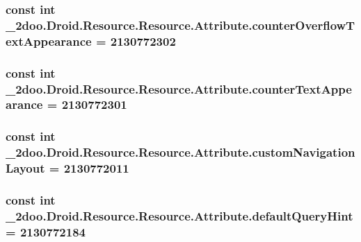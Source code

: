 \hypertarget{class__2doo_1_1_droid_1_1_resource_1_1_attribute_f6ba4afd9ef41821359896a45142a7a1}{
\subsubsection[{counterOverflowTextAppearance}]{\setlength{\rightskip}{0pt plus 5cm}const int \_\-2doo.Droid.Resource.Resource.Attribute.counterOverflowTextAppearance = 2130772302}}
\label{class__2doo_1_1_droid_1_1_resource_1_1_attribute_f6ba4afd9ef41821359896a45142a7a1}


\hypertarget{class__2doo_1_1_droid_1_1_resource_1_1_attribute_8812b7fecfaff37fc17e1e33e3cd6270}{
\subsubsection[{counterTextAppearance}]{\setlength{\rightskip}{0pt plus 5cm}const int \_\-2doo.Droid.Resource.Resource.Attribute.counterTextAppearance = 2130772301}}
\label{class__2doo_1_1_droid_1_1_resource_1_1_attribute_8812b7fecfaff37fc17e1e33e3cd6270}


\hypertarget{class__2doo_1_1_droid_1_1_resource_1_1_attribute_b554ed093df09f360bb8e35ebfb66315}{
\subsubsection[{customNavigationLayout}]{\setlength{\rightskip}{0pt plus 5cm}const int \_\-2doo.Droid.Resource.Resource.Attribute.customNavigationLayout = 2130772011}}
\label{class__2doo_1_1_droid_1_1_resource_1_1_attribute_b554ed093df09f360bb8e35ebfb66315}


\hypertarget{class__2doo_1_1_droid_1_1_resource_1_1_attribute_d533edbcde01c5693a1da941e5e3b53c}{
\subsubsection[{defaultQueryHint}]{\setlength{\rightskip}{0pt plus 5cm}const int \_\-2doo.Droid.Resource.Resource.Attribute.defaultQueryHint = 2130772184}}
\label{class__2doo_1_1_droid_1_1_resource_1_1_attribute_d533edbcde01c5693a1da941e5e3b53c}


